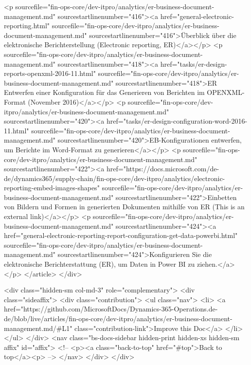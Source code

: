 <p sourcefile="fin-ops-core/dev-itpro/analytics/er-business-document-management.md" sourcestartlinenumber="416"><a href="general-electronic-reporting.html" sourcefile="fin-ops-core/dev-itpro/analytics/er-business-document-management.md" sourcestartlinenumber="416">Überblick über die elektronische Berichterstellung (Electronic reporting, ER)</a></p>
<p sourcefile="fin-ops-core/dev-itpro/analytics/er-business-document-management.md" sourcestartlinenumber="418"><a href="tasks/er-design-reports-openxml-2016-11.html" sourcefile="fin-ops-core/dev-itpro/analytics/er-business-document-management.md" sourcestartlinenumber="418">ER Entwerfen einer Konfiguration für das Generieren von Berichten im OPENXML-Format (November 2016)</a></p>
<p sourcefile="fin-ops-core/dev-itpro/analytics/er-business-document-management.md" sourcestartlinenumber="420"><a href="tasks/er-design-configuration-word-2016-11.html" sourcefile="fin-ops-core/dev-itpro/analytics/er-business-document-management.md" sourcestartlinenumber="420">EB-Konfigurationen entwerfen, um Berichte im Word-Format zu generieren</a></p>
<p sourcefile="fin-ops-core/dev-itpro/analytics/er-business-document-management.md" sourcestartlinenumber="422"><a href="https://docs.microsoft.com/de-de/dynamics365/supply-chain/fin-ops-core/dev-itpro/analytics/electronic-reporting-embed-images-shapes" sourcefile="fin-ops-core/dev-itpro/analytics/er-business-document-management.md" sourcestartlinenumber="422">Einbetten von Bildern und Formen in generierten Dokumenten mithilfe von ER (This is an external link)</a></p>
<p sourcefile="fin-ops-core/dev-itpro/analytics/er-business-document-management.md" sourcestartlinenumber="424"><a href="general-electronic-reporting-report-configuration-get-data-powerbi.html" sourcefile="fin-ops-core/dev-itpro/analytics/er-business-document-management.md" sourcestartlinenumber="424">Konfigurieren Sie die elektronische Berichterstattung (ER), um Daten in Power BI zu ziehen.</a></p>
</article>
              </div>
              
<div class="hidden-sm col-md-3" role="complementary">
  <div class="sideaffix">
    <div class="contribution">
      <ul class="nav">
        <li>
          <a href="https://github.com/MicrosoftDocs/Dynamics-365-Operations.de-de/blob/live/articles/fin-ops-core/dev-itpro/analytics/er-business-document-management.md/#L1" class="contribution-link">Improve this Doc</a>
        </li>
      </ul>
    </div>
    <nav class="bs-docs-sidebar hidden-print hidden-xs hidden-sm affix" id="affix">
    <!-- <p><a class="back-to-top" href="#top">Back to top</a><p> -->
    </nav>
  </div>
</div>


